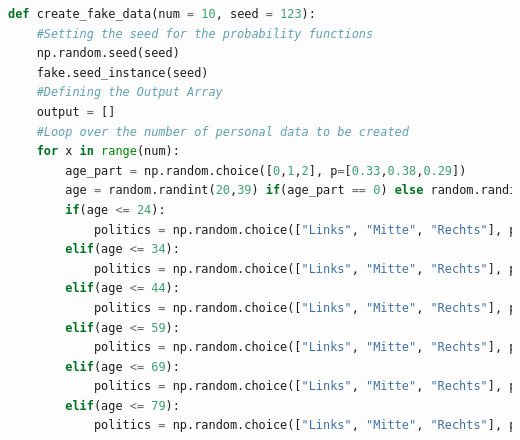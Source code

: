 \documentclass[a4paper,12pt]{report}
\begin{document}
\begin{lstlisting}[language=Python,label={lst:Sz2Z3},caption=Dritte Zelle für das Generieren der Daten]
def create_fake_data(num = 10, seed = 123):
    #Setting the seed for the probability functions
    np.random.seed(seed)
    fake.seed_instance(seed)
    #Defining the Output Array
    output = []
    #Loop over the number of personal data to be created
    for x in range(num):
        age_part = np.random.choice([0,1,2], p=[0.33,0.38,0.29])
        age = random.randint(20,39) if(age_part == 0) else random.randint(40,59) if(age_part == 1) else random.randint(60,79)
        if(age <= 24):
            politics = np.random.choice(["Links", "Mitte", "Rechts"], p=[0.28,0.631,0.089])
        elif(age <= 34):
            politics = np.random.choice(["Links", "Mitte", "Rechts"], p=[0.244,0.614,0.142])
        elif(age <= 44):
            politics = np.random.choice(["Links", "Mitte", "Rechts"], p=[0.216,0.618,0.166])
        elif(age <= 59):
            politics = np.random.choice(["Links", "Mitte", "Rechts"], p=[0.207,0.635,0.158])
        elif(age <= 69):
            politics = np.random.choice(["Links", "Mitte", "Rechts"], p=[0.177,0.687,0.136])
        elif(age <= 79):
            politics = np.random.choice(["Links", "Mitte", "Rechts"], p=[0.107,0.809,0.084])


\end{lstlisting}
\end{document}
